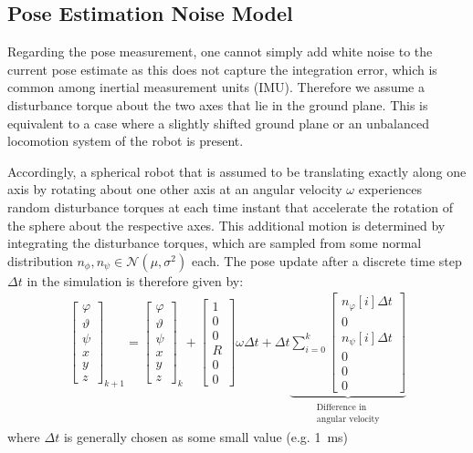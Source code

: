 \subsection{Pose Estimation Noise Model} 

Regarding the pose measurement, one cannot simply add white noise to the current pose estimate as this does not capture the integration error, which is common among inertial measurement units (IMU). 
Therefore we assume a disturbance torque about the two axes that lie in the ground plane. 
This is equivalent to a case where a slightly shifted ground plane or an unbalanced locomotion system of the robot is present.  

Accordingly, a spherical robot that is assumed to be translating exactly along one axis by rotating about one other axis at an angular velocity $\omega$  experiences random disturbance torques at each time instant that accelerate the rotation of the sphere about the respective axes. 
This additional motion is determined by integrating the disturbance torques, which are sampled from some normal distribution $n_\phi, n_\psi \in \mathcal{N}(\mu,\sigma^2)$ each.  
The pose update after a discrete time step $\Delta t$ in the simulation is therefore given by: 
\begin{align}
	\begin{bmatrix}\varphi\\\vartheta\\\psi\\x\\y\\z\end{bmatrix}_{k+1} = 
	\begin{bmatrix}\varphi\\\vartheta\\\psi\\x\\y\\z\end{bmatrix}_{k} 
	+ \begin{bmatrix}1\\0\\0\\R\\0\\0\end{bmatrix}\omega \Delta t  + \Delta t \underbrace{\sum_{i = 0}^k \begin{bmatrix}n_\varphi[i] \Delta t\\0\\n_\psi[i]\Delta t\\0\\0\\0\end{bmatrix}}_{\substack{\text{Difference in}\\\text{angular velocity}}}
\end{align}
where $\Delta t$ is generally chosen as some small value (e.g. \SI{1}{\milli\second})

